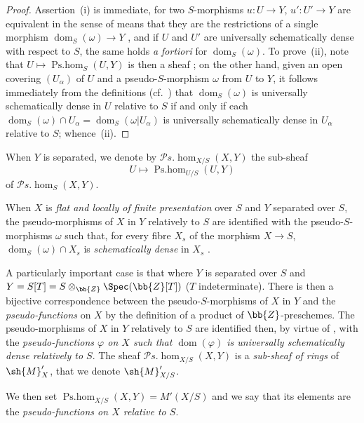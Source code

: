 \begin{proof}
Assertion~(i) is immediate, for two $S$-morphisms $u:U\to Y$, $u':U'\to Y$ are equivalent in the sense of  means that they are the restrictions of a single morphism $\operatorname{dom}_S(\omega)\to Y$ , and if $U$ and $U'$ are universally schematically dense with respect to $S$, the same holds \emph{a fortiori} for $\operatorname{dom}_S(\omega)$.
To prove~(ii), note that $U\mapsto\operatorname{Ps.hom}_S(U,Y)$ is then a sheaf ;
on the other hand, given an open covering $(U_\alpha)$ of $U$ and a pseudo-$S$-morphism $\omega$ from $U$ to $Y$, it follows immediately from the definitions (cf.\ ) that $\operatorname{dom}_S(\omega)$ is universally schematically dense in $U$ relative to $S$ if and only if each $\operatorname{dom}_S(\omega)\cap U_\alpha=\operatorname{dom}_S(\omega|U_\alpha)$ is universally schematically dense in $U_\alpha$ relative to $S$;
whence~(ii).
\end{proof}

When $Y$ is separated, we denote by $\mathscr{P}\!s.\!\operatorname{hom}_{X/S}(X,Y)$ the sub-sheaf
\[
  U\mapsto\operatorname{Ps.hom}_{U/S}(U,Y)
\]
of $\mathscr{P}\!s.\!\operatorname{hom}_S(X,Y)$.

When $X$ is \emph{flat and locally of finite presentation} over $S$ and $Y$ separated over $S$, the pseudo-morphisms of $X$ in $Y$ relatively to $S$ are identified with the pseudo-$S$-morphisms $\omega$ such that, for every fibre $X_s$ of the morphism $X\to S$, $\operatorname{dom}_S(\omega)\cap X_s$ is \emph{schematically dense} in $X_s$ .

\begin{env}[20.5.4]
\label{IV.20.5.4}
A particularly important case is that where $Y$ is separated over $S$ and $Y=S[T]=S\otimes_{\bb{Z}}\Spec(\bb{Z}[T])$ ($T$ indeterminate).
There is then a bijective correspondence between the pseudo-$S$-morphisms of $X$ in $Y$ and the \emph{pseudo-functions} on $X$  by the definition of a product of $\bb{Z}$-preschemes.
The pseudo-morphisms of $X$ in $Y$ relatively to $S$ are identified then, by virtue of , with the \emph{pseudo-functions $\varphi$ on $X$ such that $\operatorname{dom}(\varphi)$ is universally schematically dense relatively to $S$}.
The sheaf $\mathscr{P}\!s.\!\operatorname{hom}_{X/S}(X,Y)$ is a \emph{sub-sheaf of rings} of $\sh{M}'_X$, that we denote $\sh{M}'_{X/S}$.

We then set $\operatorname{Ps.hom}_{X/S}(X,Y)=M'(X/S)$ and we say that its elements are the \emph{pseudo-functions on $X$ relative to $S$}.
\end{env}

